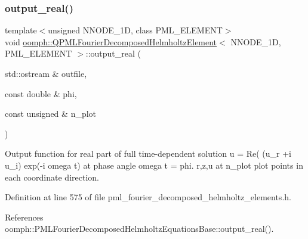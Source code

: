 \subsubsection{\texorpdfstring{output\+\_\+real()}{output\_real()}}
{\footnotesize\ttfamily template$<$unsigned N\+N\+O\+D\+E\+\_\+1D, class P\+M\+L\+\_\+\+E\+L\+E\+M\+E\+NT$>$ \\
void \hyperlink{classoomph_1_1QPMLFourierDecomposedHelmholtzElement}{oomph\+::\+Q\+P\+M\+L\+Fourier\+Decomposed\+Helmholtz\+Element}$<$ N\+N\+O\+D\+E\+\_\+1D, P\+M\+L\+\_\+\+E\+L\+E\+M\+E\+NT $>$\+::output\+\_\+real (\begin{DoxyParamCaption}\item[{std\+::ostream \&}]{outfile,  }\item[{const double \&}]{phi,  }\item[{const unsigned \&}]{n\+\_\+plot }\end{DoxyParamCaption})\hspace{0.3cm}{\ttfamily [inline]}}



Output function for real part of full time-\/dependent solution u = Re( (u\+\_\+r +i u\+\_\+i) exp(-\/i omega t) at phase angle omega t = phi. r,z,u at n\+\_\+plot plot points in each coordinate direction. 



Definition at line 575 of file pml\+\_\+fourier\+\_\+decomposed\+\_\+helmholtz\+\_\+elements.\+h.



References oomph\+::\+P\+M\+L\+Fourier\+Decomposed\+Helmholtz\+Equations\+Base\+::output\+\_\+real().

\mbox{\label{classoomph_1_1QPMLFourierDecomposedHelmholtzElement_a94735341244b53686f06fe1b37734650}} 
